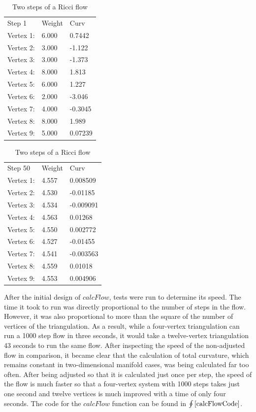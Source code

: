\documentclass[12pt]{article}
\begin{document}
\begin{table}
\begin{center}
\begin{minipage}{2.2in}
\begin{tabular}{l|l|l}
\hline
Step 1   & Weight &  Curv\\
Vertex 1:& 6.000 & 0.7442\\
Vertex 2: &3.000 & -1.122\\
Vertex 3:& 3.000 & -1.373\\
Vertex 4:& 8.000 & 1.813\\
Vertex 5: &6.000 & 1.227\\
Vertex 6: &2.000 & -3.046\\
Vertex 7: &4.000 & -0.3045\\
Vertex 8: &8.000 & 1.989\\
Vertex 9: &5.000 & 0.07239\\ \hline
\end{tabular} 
\end{minipage}
\begin{minipage}{2.2in}
\begin{tabular}{l|l|l}
\hline
Step 50 &  Weight &  Curv\\
Vertex 1:& 4.557 & 0.008509\\
Vertex 2: &4.530 & -0.01185\\
Vertex 3: &4.534 & -0.009091\\
Vertex 4:& 4.563 & 0.01268\\
Vertex 5:& 4.550 & 0.002772\\
Vertex 6: &4.527 & -0.01455\\
Vertex 7: &4.541 & -0.003563\\
Vertex 8: &4.559 & 0.01018\\
Vertex 9: &4.553 & 0.004906\\ \hline
\end{tabular}
\end{minipage}
\end{center}
\caption{Two steps of a Ricci flow}
\label{tab:ricciSteps}
\end{table}

\noindent After the initial design of $calcFlow$, tests were run to determine its speed. The time it took to run was directly proportional to the number of steps in the flow. However, it was also proportional to more than the square of the number of vertices of the triangulation. As a result, while a four-vertex triangulation can run a 1000 step flow in three seconds, it would take a twelve-vertex triangulation 43 seconds to run the same flow. After inspecting the speed of the non-adjusted flow in comparison, it became clear that the calculation of total curvature, which remains constant in two-dimensional manifold cases, was being calculated far too often. After being adjusted so that it is calculated just once per step, the speed of the flow is much faster so that a four-vertex system with 1000 steps takes just one second and twelve vertices is much improved with a time of only four seconds. The code for the $calcFlow$ function can be found in $\oint\ref{calcFlowCode}$.
\end{document}
